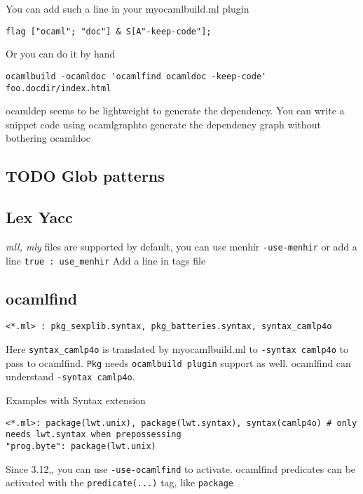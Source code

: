 \documentclass[11pt]{article}
\begin{document}
   You can add such a line in your myocamlbuild.ml plugin



\begin{verbatim}
flag ["ocaml"; "doc"] & S[A"-keep-code"];
\end{verbatim}
   Or you can do it by hand


\begin{verbatim}
ocamlbuild -ocamldoc 'ocamlfind ocamldoc -keep-code' foo.docdir/index.html
\end{verbatim}

   ocamldep seems to be lightweight to generate the dependency.  You
   can write a snippet code using ocamlgraphto generate the dependency
   graph without bothering ocamldoc
\subsection*{\textbf{TODO} Glob patterns}
\label{sec-1-8}
\subsection*{Lex Yacc}
\label{sec-1-9}

    \emph{mll, mly} files are supported by default, you can use menhir
    \texttt{-use-menhir} or add a line \texttt{true : use\_menhir} Add a line in tags
    file
\subsection*{ocamlfind}
\label{sec-1-10}


\begin{verbatim}
<*.ml> : pkg_sexplib.syntax, pkg_batteries.syntax, syntax_camlp4o
\end{verbatim}

    Here \texttt{syntax\_camlp4o} is translated by myocamlbuild.ml to \texttt{-syntax     camlp4o} to pass to ocamlfind. \texttt{Pkg} needs \texttt{ocamlbuild plugin}
    support as well. ocamlfind can understand \texttt{-syntax camlp4o}.

    Examples with Syntax extension

\begin{verbatim}
<*.ml>: package(lwt.unix), package(lwt.syntax), syntax(camlp4o) # only needs lwt.syntax when prepossessing
"prog.byte": package(lwt.unix)
\end{verbatim}

    Since 3.12,, you can use \texttt{-use-ocamlfind} to activate. ocamlfind
    predicates can be activated with the \texttt{predicate(...)} tag, like
    \texttt{package}
\end{document}
